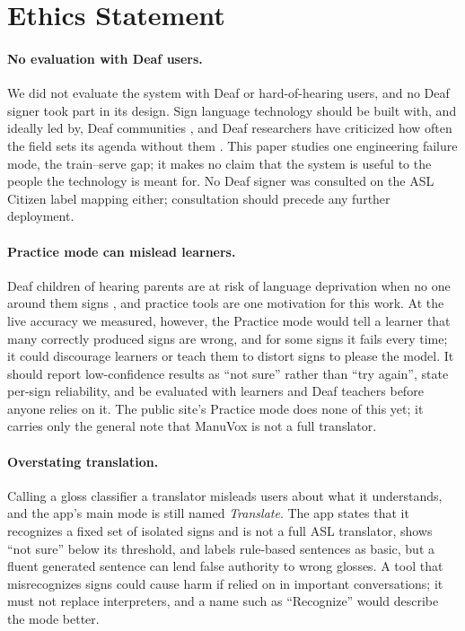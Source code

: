 \section*{Ethics Statement}

\paragraph{No evaluation with Deaf users.} We did not evaluate the system with Deaf or
hard-of-hearing users, and no Deaf signer took part in its design. Sign language technology
should be built with, and ideally led by, Deaf communities \citep{bragg2019interdisciplinary,
yin2021including,fox2023bestpractices}, and Deaf researchers have criticized how often the field
sets its agenda without them \citep{desai2024systemic}. This paper studies one engineering failure
mode, the train--serve gap; it makes no claim that the system is useful to the people the
technology is meant for. No Deaf signer was consulted on the ASL Citizen label mapping either;
consultation should precede any further deployment.

\paragraph{Practice mode can mislead learners.} Deaf children of hearing parents are at risk of
language deprivation when no one around them signs \citep{humphries2012deprivation}, and practice
tools are one motivation for this work. At the live accuracy we measured, however, the Practice
mode would tell a learner that many correctly produced signs are wrong, and for some signs it fails
every time; it could discourage learners or teach them to distort signs to please the model. It
should report low-confidence results as ``not sure'' rather than ``try again'', state per-sign
reliability, and be evaluated with learners and Deaf teachers before anyone relies on it. The
public site's Practice mode does none of this yet; it carries only the general note that ManuVox
is not a full translator.

\paragraph{Overstating translation.} Calling a gloss classifier a translator misleads users about
what it understands, and the app's main mode is still named \emph{Translate}. The app states that it
recognizes a fixed set of isolated signs and is not a full ASL translator, shows ``not sure'' below
its threshold, and labels rule-based sentences as basic, but a fluent generated sentence can lend
false authority to wrong glosses. A tool that misrecognizes signs could cause harm if relied on in
important conversations; it must not replace interpreters, and a name such as ``Recognize'' would
describe the mode better.

